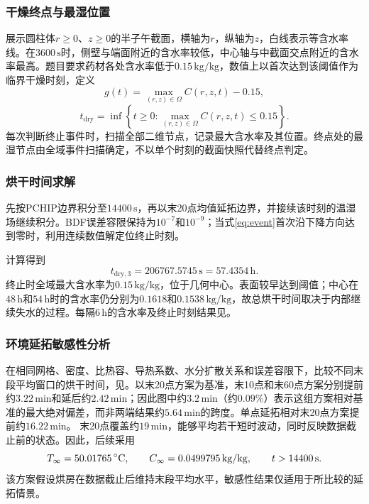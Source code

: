 \subsubsection{干燥终点与最湿位置}
展示圆柱体$r\ge0$、$z\ge0$的半子午截面，横轴为$r$，纵轴为$z$，白线表示等含水率线。在$3600\,\mathrm{s}$时，侧壁与端面附近的含水率较低，中心轴与中截面交点附近的含水率最高。题目要求药材各处含水率低于$0.15\,\mathrm{kg/kg}$，数值上以首次达到该阈值作为临界干燥时刻，定义
\begin{equation}\label{eq:event}
g(t)=\max_{(r,z)\in\Omega}C(r,z,t)-0.15,
\end{equation}
\begin{equation}
t_{\mathrm{dry}}
=\inf\left\{t\ge0:\max_{(r,z)\in\Omega}C(r,z,t)\le0.15\right\}.
\end{equation}
每次判断终止事件时，扫描全部二维节点，记录最大含水率及其位置。终点处的最湿节点由全域事件扫描确定，不以单个时刻的截面快照代替终点判定。

\subsubsection{烘干时间求解}
先按PCHIP边界积分至$14400\,\mathrm{s}$，再以末20点均值延拓边界，并接续该时刻的温湿场继续积分。BDF误差容限保持为$10^{-7}$和$10^{-9}$；当式\eqref{eq:event}首次沿下降方向达到零时，利用连续数值解定位终止时刻。

计算得到
\begin{equation}\label{eq:q3-time}
t_{\mathrm{dry},3}
=206767.5745\,\mathrm{s}
=57.4354\,\mathrm{h}.
\end{equation}
终止时全域最大含水率为$0.15\,\mathrm{kg/kg}$，位于几何中心。表面较早达到阈值；中心在$48\,\mathrm{h}$和$54\,\mathrm{h}$时的含水率仍分别为$0.1618$和$0.1538\,\mathrm{kg/kg}$，故总烘干时间取决于内部继续失水的过程。每隔$6\,\mathrm{h}$的含水率及终止时刻结果见。


\subsubsection{环境延拓敏感性分析}
在相同网格、密度、比热容、导热系数、水分扩散关系和误差容限下，比较不同末段平均窗口的烘干时间，见。以末20点方案为基准，末10点和末60点方案分别提前约$3.22\,\mathrm{min}$和延后约$2.42\,\mathrm{min}$；因此图中约$3.2\,\mathrm{min}$（约$0.09\%$）表示这组方案相对基准的最大绝对偏差，而非两端结果约$5.64\,\mathrm{min}$的跨度。单点延拓相对末20点方案提前约$16.22\,\mathrm{min}$。
末20点覆盖约$19\,\mathrm{min}$，能够平均若干短时波动，同时反映数据截止前的状态。因此，后续采用
\begin{equation}
T_\infty=50.01765\,{}^\circ\mathrm{C},\qquad
C_\infty=0.0499795\,\mathrm{kg/kg},\qquad t>14400\,\mathrm{s}.
\end{equation}
该方案假设烘房在数据截止后维持末段平均水平，敏感性结果仅适用于所比较的延拓情景。


